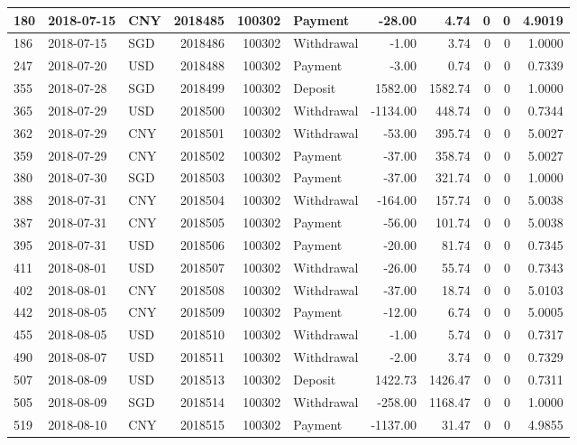 \documentclass[]{article}
\begin{document}
\begin{table}[H]
\begin{tabular}{l|l|l|r|r|l|r|r|r|r|r}
180 & 2018-07-15 & CNY & 2018485 & 100302 & Payment & -28.00 & 4.74 & 0 & 0 & 4.9019\\
\hline
186 & 2018-07-15 & SGD & 2018486 & 100302 & Withdrawal & -1.00 & 3.74 & 0 & 0 & 1.0000\\
\hline
247 & 2018-07-20 & USD & 2018488 & 100302 & Payment & -3.00 & 0.74 & 0 & 0 & 0.7339\\
\hline
355 & 2018-07-28 & SGD & 2018499 & 100302 & Deposit & 1582.00 & 1582.74 & 0 & 0 & 1.0000\\
\hline
365 & 2018-07-29 & USD & 2018500 & 100302 & Withdrawal & -1134.00 & 448.74 & 0 & 0 & 0.7344\\
\hline
362 & 2018-07-29 & CNY & 2018501 & 100302 & Withdrawal & -53.00 & 395.74 & 0 & 0 & 5.0027\\
\hline
359 & 2018-07-29 & CNY & 2018502 & 100302 & Payment & -37.00 & 358.74 & 0 & 0 & 5.0027\\
\hline
380 & 2018-07-30 & SGD & 2018503 & 100302 & Payment & -37.00 & 321.74 & 0 & 0 & 1.0000\\
\hline
388 & 2018-07-31 & CNY & 2018504 & 100302 & Withdrawal & -164.00 & 157.74 & 0 & 0 & 5.0038\\
\hline
387 & 2018-07-31 & CNY & 2018505 & 100302 & Payment & -56.00 & 101.74 & 0 & 0 & 5.0038\\
\hline
395 & 2018-07-31 & USD & 2018506 & 100302 & Payment & -20.00 & 81.74 & 0 & 0 & 0.7345\\
\hline
411 & 2018-08-01 & USD & 2018507 & 100302 & Withdrawal & -26.00 & 55.74 & 0 & 0 & 0.7343\\
\hline
402 & 2018-08-01 & CNY & 2018508 & 100302 & Withdrawal & -37.00 & 18.74 & 0 & 0 & 5.0103\\
\hline
442 & 2018-08-05 & CNY & 2018509 & 100302 & Payment & -12.00 & 6.74 & 0 & 0 & 5.0005\\
\hline
455 & 2018-08-05 & USD & 2018510 & 100302 & Withdrawal & -1.00 & 5.74 & 0 & 0 & 0.7317\\
\hline
490 & 2018-08-07 & USD & 2018511 & 100302 & Withdrawal & -2.00 & 3.74 & 0 & 0 & 0.7329\\
\hline
507 & 2018-08-09 & USD & 2018513 & 100302 & Deposit & 1422.73 & 1426.47 & 0 & 0 & 0.7311\\
\hline
505 & 2018-08-09 & SGD & 2018514 & 100302 & Withdrawal & -258.00 & 1168.47 & 0 & 0 & 1.0000\\
\hline
519 & 2018-08-10 & CNY & 2018515 & 100302 & Payment & -1137.00 & 31.47 & 0 & 0 & 4.9855\\
\hline

\end{tabular}
\end{table}
\end{document}
